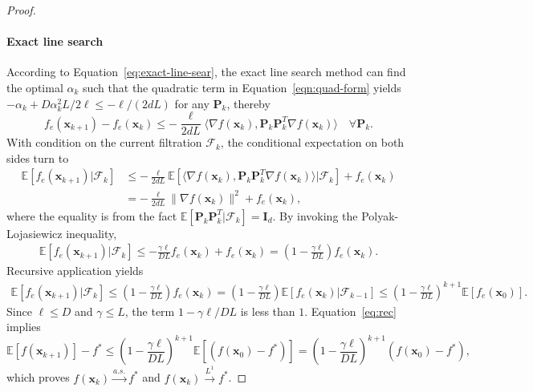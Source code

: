\documentclass[10pt,a4paper]{amsart}
\newcommand{\Lip}{L}
\begin{document}
\begin{proof}
\paragraph{Exact line search}
According to Equation~\eqref{eq:exact-line-sear}, the exact line search method can find the optimal $\alpha_k$ such that the quadratic term in Equation~\eqref{eqn:quad-form} yields $-\alpha_k+D\alpha_k^2\Lip/2\ell \leq -\ell/(2d\Lip)$ for any $\bm P_k$, thereby
\begin{equation}
f_e(\bm x_{k+1}) - f_e(\bm x_k) \leq -\frac{\ell}{2d\Lip}\langle \nabla f(\bm x_k), \bm P_k\bm P_k^T\nabla f(\bm x_k)\rangle \quad \forall \bm P_k.
\end{equation}
With condition on the current filtration $\mathcal{F}_k$, the conditional expectation on both sides turn to
\begin{equation}
\label{eqn:exp-pf}
\begin{aligned}
\mathbb{E}[f_e(\bm x_{k+1})\vert\mathcal{F}_k]
&\leq -\frac{\ell}{2d\Lip}\mathbb{E}\left[\langle\nabla f(\bm x_k),\bm P_k\bm P_k^T\nabla f(\bm x_k)\rangle\vert\mathcal{F}_k\right] + f_e(\bm x_k)\\
&= -\frac{\ell}{2d\Lip}\lVert \nabla f(\bm x_k)\rVert^2 + f_e(\bm x_k),
\end{aligned}
\end{equation}
where the equality is from the fact $\mathbb{E}[\bm P_k\bm P_k^T\vert\mathcal{F}_k]=\bm I_d$. By invoking the Polyak-Lojasiewicz inequality,
\begin{equation}
\label{eqn:pl}
\begin{aligned}
\mathbb{E}[f_e(\bm x_{k+1})\vert\mathcal{F}_k] 
\leq -\frac{\gamma\ell}{D\Lip}f_e(\bm x_k) + f_e(\bm x_k) 
= \left(1-\frac{\gamma\ell}{D\Lip}\right)f_e(\bm x_k).
\end{aligned}
\end{equation}
Recursive application yields
\begin{equation}
\label{eq:rec}
\begin{aligned}
\mathbb{E}[f_e(\bm x_{k+1})\vert\mathcal{F}_k] 
\leq \left(1-\frac{\gamma\ell}{D\Lip}\right)f_e(\bm x_k)
= \left(1-\frac{\gamma\ell}{D\Lip}\right)\mathbb{E}[f_e(\bm x_k)\vert\mathcal{F}_{k-1}]
\leq \left(1-\frac{\gamma\ell}{D\Lip}\right)^{k+1}\mathbb{E}[f_e(\bm x_0)].
\end{aligned}
\end{equation}
Since $\ell\leq D$ and $\gamma\leq \Lip$, the term $1-\gamma\ell/D\Lip$ is less than $1$. Equation~\eqref{eq:rec} implies
\begin{equation}
\mathbb{E}\left[f(\bm x_{k+1})\right] - f^* \leq \left(1-\frac{\gamma\ell}{D\Lip}\right)^{k+1}\mathbb{E}[(f(\bm x_0) - f^*)] = \left(1-\frac{\gamma\ell}{D\Lip}\right)^{k+1}(f(\bm x_0) - f^*),
\end{equation}
which proves $f(\bm x_k)\overset{a.s.}{\to}f^*$ and $f(\bm x_k)\overset{L^1}{\to}f^*$.


\end{proof}
\end{document}
